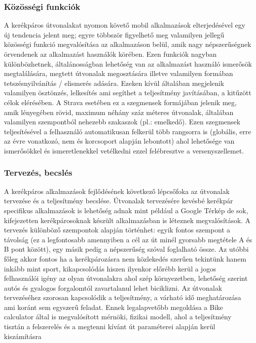\subsubsection{Közösségi funkciók} 
A kerékpáros útvonalakat nyomon követő mobil alkalmazások elterjedésével egy új tendencia jelent meg; egyre többször figyelhető meg valamilyen jellegű közösségi funkció megvalósítása az alkalmazáson belül, amik nagy népszerűségnek örvendenek az alkalmazást használók körében. Ezen funkciók nagyban különbözhetnek, általánosságban lehetőség van az alkalmazást használó ismerősök megtalálására, megtett útvonalak megosztására illetve valamilyen formában tetszésnyilvánítás / elismerés adására. Ezeken kívül általában megjelenik valamilyen ösztönzés, lelkesítés ami segíthet a teljesítmény javításában, a kitűzött célok elérésében. A Strava esetében ez a szegmensek formájában jelenik meg, amik lényegében rövid, maximum néhány száz méteres útvonalak, általában valamilyen szempontból nehezebb szakaszok (pl.: emelkedő). Ezen szegmensek teljesítésével a felhasználó automatikusan felkerül több rangsorra is (globális, erre az évre vonatkozó, nem és korcsoport alapján lebontott) ahol lehetősége van ismerősökkel és ismeretlenekkel vetélkedni ezzel felébresztve a versenyszellemet. 

\subsubsection{Tervezés, becslés} 
A kerékpáros alkalmazások fejlődésének következő lépcsőfoka az útvonalak tervezése és a teljesítmény becslése. Útvonalak tervezésére kevésbé kerékpár specifikus alkalmazások is lehetőség adnak mint például a Google Térkép de sok, kifejezetten kerékpárosoknak készült alkalmazásban is léteznek megvalósítások. A tervezés különböző szempontok alapján történhet: egyik fontos szempont a távolság (ez a legfontosabb amennyiben a cél az út minél gyorsabb megtétele A és B pont között), egy másik pedig a népszerűség szóval foglalható össze. Az utóbbi főleg akkor fontos ha a kerékpározásra nem közlekedés szerűen tekintünk hanem inkább mint sport, kikapcsolódás hiszen ilyenkor előrébb kerül a jogos felhasználói igény az olyan útvonalakra ahol szép környezetben, lehetőség szerint autós és gyalogos forgalomtól zavartalanul lehet biciklizni. Az útvonalak tervezéséhez szorosan kapcsolódik a teljesítmény, a várható idő meghatározása ami koránt sem egyszerű feladat. Ennek legalapvetőbb megoldása a Bike calculator által is megvalósított mérnöki, fizikai modell, ahol a teljesítmény tisztán a felszerelés és a megtenni kívánt út paraméterei alapján kerül kiszámításra


